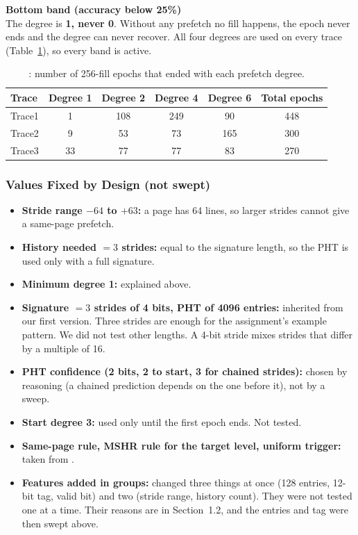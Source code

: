 \textbf{Bottom band (accuracy below 25\%)}\\
The degree is \textbf{1, never 0}. Without any prefetch no fill happens, the epoch never ends and the degree can never
recover. All four degrees are used on every trace (Table~\ref{tab:t1-epochs}), so every band is active.
\begin{table}[H]\centering\small
\begin{tabular}{@{}lccccc@{}}
\toprule
Trace & Degree 1 & Degree 2 & Degree 4 & Degree 6 & Total epochs \\
\midrule
Trace1 & 1  & 108 & 249 & 90  & 448 \\
Trace2 & 9  & 53  & 73  & 165 & 300 \\
Trace3 & 33 & 77  & 77  & 83  & 270 \\
\bottomrule
\end{tabular}
\caption{: number of 256-fill epochs that ended with each prefetch degree.}
\label{tab:t1-epochs}
\end{table}

\subsubsection{Values Fixed by Design (not swept)}
\begin{itemize}
  \item \textbf{Stride range $-64$ to $+63$:} a page has 64 lines, so larger strides cannot give a same-page prefetch.
  \item \textbf{History needed $=3$ strides:} equal to the signature length, so the PHT is used only with a full signature.
  \item \textbf{Minimum degree 1:} explained above.
  \item \textbf{Signature $=3$ strides of 4 bits, PHT of 4096 entries:} inherited from our first version. Three
        strides are enough for the assignment's example pattern. We did not test other lengths. A 4-bit stride mixes
        strides that differ by a multiple of 16.
  \item \textbf{PHT confidence (2 bits, 2 to start, 3 for chained strides):} chosen by reasoning (a chained prediction
        depends on the one before it), not by a sweep.
  \item \textbf{Start degree 3:} used only until the first epoch ends. Not tested.
  \item \textbf{Same-page rule, MSHR rule for the target level, uniform trigger:} taken from .
  \item \textbf{Features added in groups:}  changed three things at once (128 entries, 12-bit tag, valid bit)
        and  two (stride range, history count). They were not tested one at a time. Their reasons are
        in Section~1.2, and the entries and tag were then swept above.
\end{itemize}

